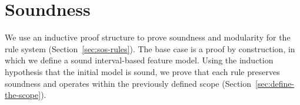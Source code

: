 \chapter{Soundness}
\label{cha:soundness}



We use an inductive proof structure to prove soundness and modularity for the rule system (Section~\vref{sec:sos-rules}). The base case is a proof by construction, in which we define a sound interval-based feature model. Using the induction hypothesis that the initial model is sound, we prove that each rule preserves soundness and operates within the previously defined scope (Section~\vref{sec:define-the-scope}).






















